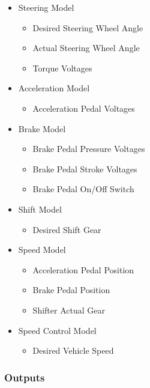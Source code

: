 \documentclass[12pt]{article} %
\begin{document}
\begin{itemize}
    \item Steering Model
    \begin{itemize}
    		\item Desired Steering Wheel Angle
    		\item Actual Steering Wheel Angle 
    		\item Torque Voltages
    \end{itemize}
    \item Acceleration Model
    \begin{itemize}
    		\item Acceleration Pedal Voltages
    \end{itemize}
    \item Brake Model
    \begin{itemize}
    		\item Brake Pedal Pressure Voltages
    		\item Brake Pedal Stroke Voltages 
    		\item Brake Pedal On/Off Switch
    \end{itemize}
    \item Shift Model
    \begin{itemize}
    		\item Desired Shift Gear
    \end{itemize}
    \item Speed Model
    \begin{itemize}
    		\item Acceleration Pedal Position
    		\item Brake Pedal Position
    		\item Shifter Actual Gear
    \end{itemize}
    \item Speed Control Model
    \begin{itemize}
    		\item Desired Vehicle Speed
    \end{itemize}
\end{itemize}

\subsubsection{Outputs}
\end{document}
